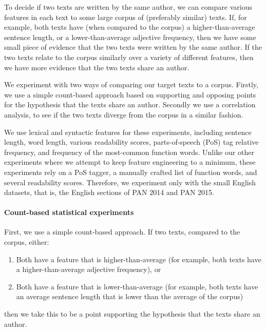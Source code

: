 To decide if two texts are written by the same author, we can compare
various features in each text to some large corpus of (preferably
similar) texts. If, for example, both texts have (when compared to the
corpus) a higher-than-average sentence length, or a lower-than-average
adjective frequency, then we have some small piece of evidence that the
two texts were written by the same author. If the two texts relate to
the corpus similarly over a variety of different features, then we have
more evidence that the two texts share an author.

We experiment with two ways of comparing our target texts to a corpus.
Firstly, we use a simple count-based approach based on supporting and
opposing points for the hypothesis that the texts share an author.
Secondly we use a correlation analysis, to see if the two texts diverge
from the corpus in a similar fashion.

We use lexical and syntactic features for these experiments, including
sentence length, word length, various readability scores,
parts-of-speech (PoS) tag relative frequency, and frequency of the
most-common function words. Unlike our other experiments where we attempt 
to keep feature engineering to a minimum, these experiments rely on a 
PoS tagger, a manually crafted list of function words, and several 
readability scores. Therefore, we experiment only with the small 
English datasets, that is, the English sections of PAN 2014 and PAN 2015.

\paragraph{Count-based statistical
experiments}\label{count-based-statistical-experiments}

First, we use a simple count-based approach. If two texts, compared to
the corpus, either:

\begin{enumerate}
\def\labelenumi{\alph{enumi})}
\item
  Both have a feature that is higher-than-average (for example, both texts have
  a higher-than-average adjective frequency), or
\item
  Both have a feature that is lower-than-average (for example, both texts have
  an average sentence length that is lower than the average of the
  corpus)
\end{enumerate}

then we take this to be a point supporting the hypothesis that the texts
share an author.

